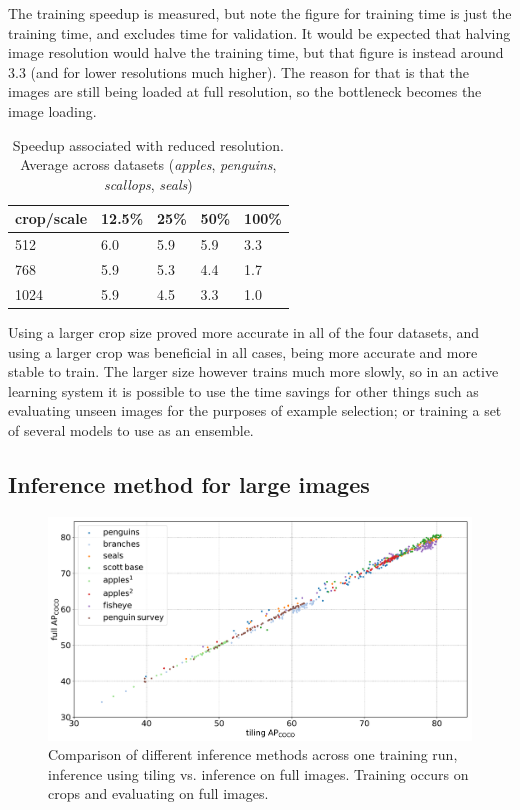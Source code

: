The training speedup is measured, but note the figure for training time is just the training time, and excludes time for validation. It would be expected that halving image resolution would halve the training time, but that figure is instead around $3.3$ (and for lower resolutions much higher). The reason for that is that the images are still being loaded at full resolution, so the bottleneck becomes the image loading.

\begin{table}[ht]
  \centering
    \caption{Speedup associated with reduced resolution. Average across datasets (\emph{apples}, \emph{penguins}, \emph{scallops}, \emph{seals})  }
  \begin{tabular}{ l | l l l l}
    crop/scale & 12.5\% & 25\% & 50\% & 100\% \\
    \toprule
        512   & 6.0  & 5.9  &  5.9  & 3.3 \\
        768   & 5.9 & 5.3  &  4.4 &  1.7 \\
        1024  & 5.9 & 4.5  &  3.3  & 1.0 \\
    \bottomrule
  \end{tabular}
\label{tab:speed_scale_crop}
\end{table}


Using a larger crop size proved more accurate in all of the four datasets, and using a larger crop was beneficial in all cases, being more accurate and more stable to train. The larger size however trains much more slowly, so in an active learning system it is possible to use the time savings for other things such as evaluating unseen images for the purposes of example selection; or training a set of several models to use as an ensemble.


\subsection {Inference method for large images}

\begin{figure}[h] 
  \centering
  \includegraphics[width=1.0\linewidth]{charts/training/splits_scatters.pdf}
  \caption{Comparison of different inference methods across one training run, inference using tiling vs. inference on full images. Training occurs on crops and evaluating on full images. }   
  \label{fig:inference_method}
\end{figure}


